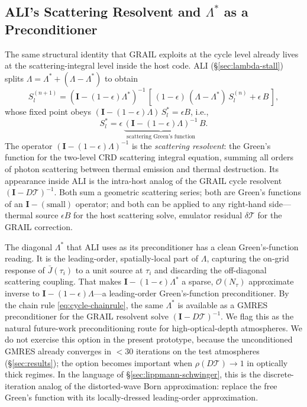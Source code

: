 \documentclass[11pt]{article}
\newcommand{\Lop}{\Lambda}
\newcommand{\Lstar}{\Lambda^{*}}
\newcommand{\Tcyc}{\mathcal{T}}
\begin{document}
\subsection{ALI's Scattering Resolvent and $\Lstar$ as a Preconditioner}
\label{sec:ali-scattering}

The same structural identity that GRAIL exploits at the cycle level
already lives at the scattering-integral level inside the host code.
ALI (§\ref{sec:lambda-stall}) splits $\Lop = \Lstar + (\Lop -
\Lstar)$ to obtain
\begin{equation}
S_l^{(n+1)} = (\mathbf{I} - (1-\epsilon)\Lstar)^{-1}\,
\!\left[\,(1-\epsilon)\,(\Lop - \Lstar)\,S_l^{(n)} + \epsilon\, B\,\right] ,
\label{eq:ali-iter}
\end{equation}
whose fixed point obeys $(\mathbf{I} - (1-\epsilon)\Lop)\, S_l^* =
\epsilon B$, i.e.,
\begin{equation}
S_l^* = \epsilon\,\underbrace{(\mathbf{I} - (1-\epsilon)\Lop)^{-1}}_{\text{scattering Green's function}}\,B .
\end{equation}
The operator $(\mathbf{I} - (1-\epsilon)\Lop)^{-1}$ is the
\emph{scattering resolvent}: the Green's function for the two-level
CRD scattering integral equation, summing all orders of photon
scattering between thermal emission and thermal destruction.  Its
appearance inside ALI is the intra-host analog of the GRAIL cycle
resolvent $(\mathbf{I} - D\Tcyc)^{-1}$.  Both sum a geometric
scattering series; both are Green's functions of an $\mathbf{I} -
(\text{small})$ operator; and both can be applied to any right-hand
side---thermal source $\epsilon B$ for the host scattering solve,
emulator residual $\delta\mathcal{T}$ for the GRAIL correction.

The diagonal $\Lstar$ that ALI uses as its preconditioner has a clean
Green's-function reading.  It is the leading-order, spatially-local
part of $\Lop$, capturing the on-grid response of $\bar{J}(\tau_i)$ to
a unit source at $\tau_i$ and discarding the off-diagonal scattering
coupling.  That makes $\mathbf{I} - (1-\epsilon)\Lstar$ a sparse,
$\mathcal{O}(N_\tau)$ approximate inverse to $\mathbf{I} -
(1-\epsilon)\Lop$---a leading-order Green's-function preconditioner.
By the chain rule \eqref{eq:cycle-chainrule}, the same $\Lstar$ is
available as a GMRES preconditioner for the GRAIL resolvent solve
$(\mathbf{I} - D\Tcyc)^{-1}$.  We flag this as the natural future-work
preconditioning route for high-optical-depth atmospheres.  We do not
exercise this option in the present prototype, because the
unconditioned GMRES already converges in $<\!30$ iterations on the test
atmospheres (§\ref{sec:results}); the option becomes important when
$\rho(D\Tcyc) \to 1$ in optically thick regimes.  In the language of
\S\ref{sec:lippmann-schwinger}, this is the discrete-iteration analog
of the distorted-wave Born approximation: replace the free Green's
function with its locally-dressed leading-order approximation.
\end{document}

